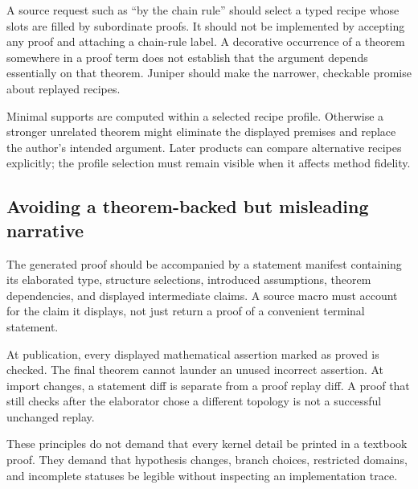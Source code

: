 \documentclass[11pt,a4paper]{article}
\theoremstyle{definition}\newtheorem{definition}[theorem]{Definition}
\theoremstyle{remark}\newtheorem{remark}[theorem]{Remark}
\begin{document}
A source request such as ``by the chain rule'' should select a typed recipe whose slots are filled by subordinate proofs. It should not be implemented by accepting any proof and attaching a chain-rule label. A decorative occurrence of a theorem somewhere in a proof term does not establish that the argument depends essentially on that theorem. Juniper should make the narrower, checkable promise about replayed recipes.

Minimal supports are computed within a selected recipe profile. Otherwise a stronger unrelated theorem might eliminate the displayed premises and replace the author's intended argument. Later products can compare alternative recipes explicitly; the profile selection must remain visible when it affects method fidelity.

\subsection{Avoiding a theorem-backed but misleading narrative}
The generated proof should be accompanied by a statement manifest containing its elaborated type, structure selections, introduced assumptions, theorem dependencies, and displayed intermediate claims. A source macro must account for the claim it displays, not just return a proof of a convenient terminal statement.

At publication, every displayed mathematical assertion marked as proved is checked. The final theorem cannot launder an unused incorrect assertion. At import changes, a statement diff is separate from a proof replay diff. A proof that still checks after the elaborator chose a different topology is not a successful unchanged replay.

These principles do not demand that every kernel detail be printed in a textbook proof. They demand that hypothesis changes, branch choices, restricted domains, and incomplete statuses be legible without inspecting an implementation trace.
\end{document}
